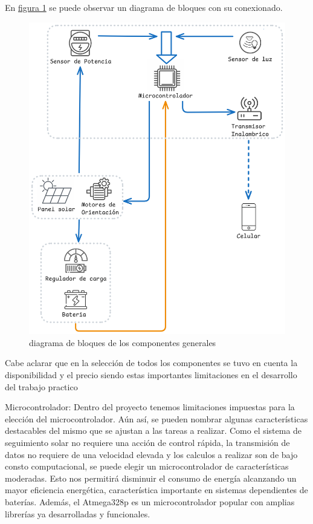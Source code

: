 \documentclass[a4paper,12pt]{article}
\begin{document}
En \hyperref[fig:diagrama]{figura 1} se puede observar un diagrama de bloques con su conexionado. 

\begin{figure}[H]
    \centering
    \includegraphics[width=0.75\linewidth]{diagrama_proyecto.png}
    \caption{ diagrama de bloques de los componentes generales}
    \label{fig:diagrama}
\end{figure}


Cabe aclarar que en la selección de todos los componentes se tuvo en cuenta la disponibilidad y el precio siendo estas importantes limitaciones en el desarrollo del trabajo practico

Microcontrolador: 
Dentro del proyecto tenemos limitaciones impuestas para la elección del microcontrolador. Aún así, se pueden nombrar algunas características destacables del mismo que se ajustan a las tareas a realizar. Como el sistema de seguimiento solar no requiere una acción de control rápida, la transmisión de datos no requiere de una velocidad elevada y los calculos a realizar son de bajo consto computacional, se puede elegir un microcontrolador de características moderadas. Esto nos permitirá disminuir el consumo de energía alcanzando un mayor eficiencia energética, característica importante en sistemas  dependientes de baterías. Además, el Atmega328p es un microcontrolador popular con amplias librerías ya desarrolladas y funcionales.\\
\end{document}
